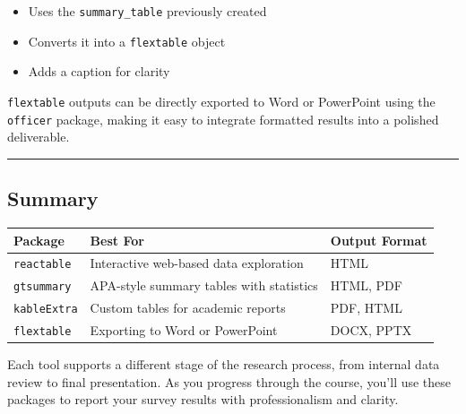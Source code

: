 \documentclass[
]{book}
\providecommand{\tightlist}{%
  \setlength{\itemsep}{0pt}\setlength{\parskip}{0pt}}
\begin{document}
\begin{itemize}
\tightlist
\item
  Uses the \texttt{summary\_table} previously created
\item
  Converts it into a \texttt{flextable} object
\item
  Adds a caption for clarity
\end{itemize}

\texttt{flextable} outputs can be directly exported to Word or PowerPoint using the \texttt{officer} package, making it easy to integrate formatted results into a polished deliverable.

\begin{center}\rule{0.5\linewidth}{0.5pt}\end{center}

\subsection*{Summary}\label{summary-2}

\begin{longtable}[]{@{}
  >{\raggedright\arraybackslash}p{}
  >{\raggedright\arraybackslash}p{}
  >{\raggedright\arraybackslash}p{}@{}}
\toprule\noalign{}
\begin{minipage}[b]{\linewidth}\raggedright
Package
\end{minipage} & \begin{minipage}[b]{\linewidth}\raggedright
Best For
\end{minipage} & \begin{minipage}[b]{\linewidth}\raggedright
Output Format
\end{minipage} \\
\midrule\noalign{}
\endhead
\bottomrule\noalign{}
\endlastfoot
\texttt{reactable} & Interactive web-based data exploration & HTML \\
\texttt{gtsummary} & APA-style summary tables with statistics & HTML, PDF \\
\texttt{kableExtra} & Custom tables for academic reports & PDF, HTML \\
\texttt{flextable} & Exporting to Word or PowerPoint & DOCX, PPTX \\
\end{longtable}

Each tool supports a different stage of the research process, from internal data review to final presentation. As you progress through the course, you'll use these packages to report your survey results with professionalism and clarity.
\end{document}
